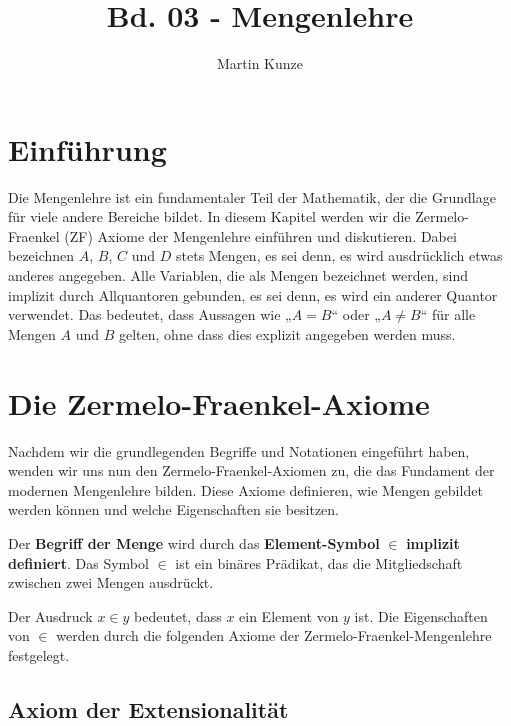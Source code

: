 \documentclass[main.tex]{subfiles}
\title{Bd. 03 - Mengenlehre}
\author{Martin Kunze}
\date{}
\begin{document}
\maketitle
\tableofcontents



\chapter{Einführung}

Die Mengenlehre ist ein fundamentaler Teil der Mathematik, der die Grundlage für viele andere Bereiche bildet. In diesem Kapitel werden wir die Zermelo-Fraenkel (ZF) Axiome der Mengenlehre einführen und diskutieren. Dabei bezeichnen \( A \), \( B \), \( C \) und \( D \) stets Mengen, es sei denn, es wird ausdrücklich etwas anderes angegeben. Alle Variablen, die als Mengen bezeichnet werden, sind implizit durch Allquantoren gebunden, es sei denn, es wird ein anderer Quantor verwendet. Das bedeutet, dass Aussagen wie „\( A = B \)“ oder „\( A \neq B \)“ für alle Mengen \( A \) und \( B \) gelten, ohne dass dies explizit angegeben werden muss.

\chapter{Die Zermelo-Fraenkel-Axiome}

Nachdem wir die grundlegenden Begriffe und Notationen eingeführt haben, wenden wir uns nun den Zermelo-Fraenkel-Axiomen zu, die das Fundament der modernen Mengenlehre bilden. Diese Axiome definieren, wie Mengen gebildet werden können und welche Eigenschaften sie besitzen.
\begin{definition}
Der \textbf{Begriff der Menge} wird durch das \textbf{Element-Symbol} \(\in\) \textbf{implizit definiert}. 
Das Symbol \(\in\) ist ein binäres Prädikat, das die Mitgliedschaft zwischen zwei Mengen ausdrückt. 

Der Ausdruck \(x \in y\) bedeutet, dass \(x\) ein Element von \(y\) ist. Die Eigenschaften von \(\in\) 
werden durch die folgenden Axiome der Zermelo-Fraenkel-Mengenlehre festgelegt.
\end{definition}

\section{Axiom der Extensionalität}

%
{%
% 
}%
\end{document}
